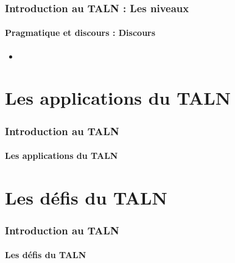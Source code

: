 \documentclass{beamer}
\begin{document}
\begin{frame}
\frametitle{Introduction au TALN : Les niveaux}
\framesubtitle{Pragmatique et discours : Discours}

\begin{itemize}
	\item 
\end{itemize}

\end{frame}

\section{Les applications du TALN}

\begin{frame}
\frametitle{Introduction au TALN}
\framesubtitle{Les applications du TALN}

\end{frame}

\section{Les défis du TALN}

\begin{frame}
\frametitle{Introduction au TALN}
\framesubtitle{Les défis du TALN}

\end{frame}



\end{document}
